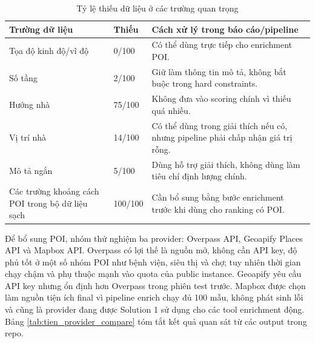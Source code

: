 \documentclass[a4paper,12pt]{article}
\begin{document}
\begin{table}[H]
\centering
\caption{Tỷ lệ thiếu dữ liệu ở các trường quan trọng}
\label{tab:tien_missing_values}
\small
\begin{tabularx}{\textwidth}{|P{5.2cm}|P{2.4cm}|Y|}
\hline
\textbf{Trường dữ liệu} & \textbf{Thiếu} & \textbf{Cách xử lý trong báo cáo/pipeline} \\ \hline
Tọa độ kinh độ/vĩ độ & 0/100 & Có thể dùng trực tiếp cho enrichment POI. \\ \hline
Số tầng & 2/100 & Giữ làm thông tin mô tả, không bắt buộc trong hard constraints. \\ \hline
Hướng nhà & 75/100 & Không đưa vào scoring chính vì thiếu quá nhiều. \\ \hline
Vị trí nhà & 14/100 & Có thể dùng trong giải thích nếu có, nhưng pipeline phải chấp nhận giá trị rỗng. \\ \hline
Mô tả ngắn & 5/100 & Dùng hỗ trợ giải thích, không dùng làm tiêu chí định lượng chính. \\ \hline
Các trường khoảng cách POI trong bộ dữ liệu sạch & 100/100 & Cần bổ sung bằng bước enrichment trước khi dùng cho ranking có POI. \\ \hline
\end{tabularx}
\end{table}

Để bổ sung POI, nhóm thử nghiệm ba provider: Overpass API, Geoapify Places API và Mapbox API. Overpass có lợi thế là nguồn mở, không cần API key, độ phủ tốt ở một số nhóm POI như bệnh viện, siêu thị và chợ; tuy nhiên thời gian chạy chậm và phụ thuộc mạnh vào quota của public instance. Geoapify yêu cầu API key nhưng ổn định hơn Overpass trong phiên test trước. Mapbox được chọn làm nguồn tiện ích final vì pipeline enrich chạy đủ 100 mẫu, không phát sinh lỗi và cũng là provider đang được Solution 1 sử dụng cho các tool enrichment động. Bảng \ref{tab:tien_provider_compare} tóm tắt kết quả quan sát từ các output trong repo.
\end{document}
